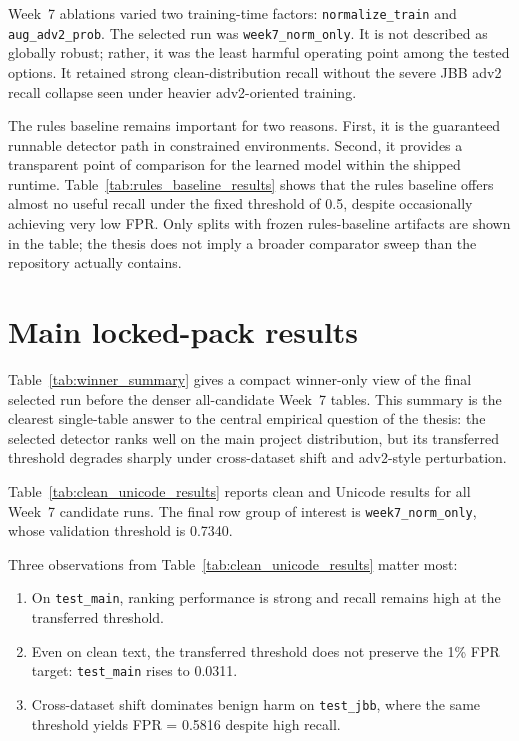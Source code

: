 Week~7 ablations varied two training-time factors: \texttt{normalize\_train} and \texttt{aug\_adv2\_prob}. The selected run was \texttt{week7\_norm\_only}. It is not described as globally robust; rather, it was the least harmful operating point among the tested options. It retained strong clean-distribution recall without the severe JBB adv2 recall collapse seen under heavier adv2-oriented training.

The rules baseline remains important for two reasons. First, it is the guaranteed runnable detector path in constrained environments. Second, it provides a transparent point of comparison for the learned model within the shipped runtime. Table~\ref{tab:rules_baseline_results} shows that the rules baseline offers almost no useful recall under the fixed threshold of 0.5, despite occasionally achieving very low FPR. Only splits with frozen rules-baseline artifacts are shown in the table; the thesis does not imply a broader comparator sweep than the repository actually contains.



\section{Main locked-pack results}

Table~\ref{tab:winner_summary} gives a compact winner-only view of the final selected run before the denser all-candidate Week~7 tables. This summary is the clearest single-table answer to the central empirical question of the thesis: the selected detector ranks well on the main project distribution, but its transferred threshold degrades sharply under cross-dataset shift and adv2-style perturbation.



Table~\ref{tab:clean_unicode_results} reports clean and Unicode results for all Week~7 candidate runs. The final row group of interest is \texttt{week7\_norm\_only}, whose validation threshold is 0.7340.



Three observations from Table~\ref{tab:clean_unicode_results} matter most:
\begin{enumerate}
  \item On \texttt{test\_main}, ranking performance is strong and recall remains high at the transferred threshold.
  \item Even on clean text, the transferred threshold does not preserve the 1\% FPR target: \texttt{test\_main} rises to 0.0311.
  \item Cross-dataset shift dominates benign harm on \texttt{test\_jbb}, where the same threshold yields FPR = 0.5816 despite high recall.
\end{enumerate}

